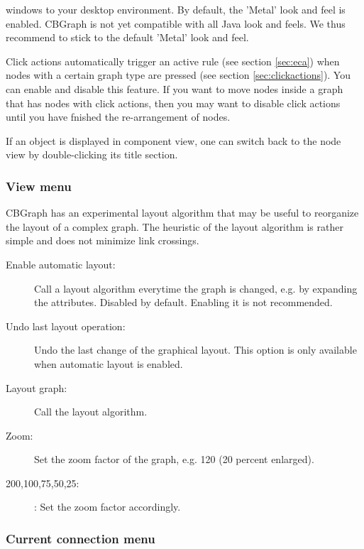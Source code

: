 \begin{description}
windows to your desktop environment. By default, the 'Metal' look and feel is enabled.
CBGraph is not yet compatible with all Java look and feels. We thus recommend to
stick to the default 'Metal' look and feel.
\item[Enable Click Actions:] Click actions automatically trigger an active rule
(see section \ref{sec:eca}) when nodes with a certain graph type are pressed
(see section \ref{sec:clickactions}).
You can enable and disable this feature. If you want to move nodes inside a
graph that has nodes with click actions, then you may want to disable click actions
until you have fnished the re-arrangement of nodes.

\end{description}


If an object is displayed in component view, one can switch back to the node
view by double-clicking its title section. 

\subsubsection{View menu}

CBGraph has an experimental layout algorithm that may be useful
to reorganize the layout of a complex graph. The heuristic of the layout
algorithm is rather simple and does not minimize link crossings.

\begin{description}
\item[Enable automatic layout:] Call a layout algorithm everytime the graph
is changed, e.g. by expanding the attributes. Disabled by default. Enabling
it is not recommended.
\item[Undo last layout operation:] Undo the last  change of the
graphical layout. This option is only available when automatic layout is enabled.
\item[Layout graph:] Call the layout algorithm.
\item[Zoom:] Set the zoom factor of the graph, e.g. 120 (20 percent enlarged).
\item[200,100,75,50,25:]: Set the zoom factor accordingly.
\end{description}


\subsubsection{Current connection menu}

